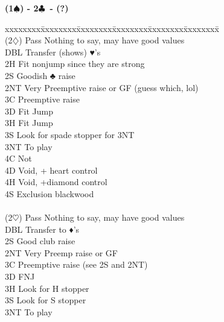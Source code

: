 \documentclass[10pt]{article}
\renewcommand{\c}{$\clubsuit$}
\renewcommand{\d}{$\diamondsuit$}
\newcommand{\h}{$\heartsuit$}
\newcommand{\s}{$\spadesuit$}
\newenvironment{bidtable}[1][]
{\textbf{#1}
  \begin{adjustwidth}{1em}{}
    \addvspace{2pt}
    \begin{tabbing}
      xxxxxxxx\=xxxxxxxx\=xxxxxxxx\=xxxxxxxx\=xxxxxxxx\=xxxxxxxx\=\kill}
{\end{tabbing}\end{adjustwidth}\bigskip}%
\begin{document}
\begin{multicols*}{2}
\begin{bidtable}[(1\s) - 2\c\ - (?)]
                                                                 \\
(2\d)  \> Pass \> Nothing to say, may have good values           \\
       \> DBL  \> Transfer (shows)  ♥’s                          \\
       \> 2H   \> Fit nonjump since they are strong              \\
       \> 2S   \> Goodish ♣ raise                                \\
       \> 2NT  \> Very Preemptive raise or GF (guess which, lol) \\
       \> 3C   \> Preemptive raise                               \\
       \> 3D   \> Fit Jump                                       \\
       \> 3H   \> Fit Jump                                       \\
       \> 3S   \> Look for spade stopper for 3NT                 \\
       \> 3NT  \> To play                                        \\
       \> 4C   \> Not                                            \\
       \> 4D   \> Void,  + heart control                         \\
       \> 4H   \> Void, +diamond control                         \\
       \> 4S   \> Exclusion blackwood                            \\
                                                                 \\
(2\h)  \> Pass \> Nothing to say, may have good values           \\
       \> DBL  \> Transfer to ♦’s                                \\
       \> 2S   \> Good club raise                                \\
       \> 2NT  \> Very Preemp raise or GF                        \\
       \> 3C   \> Preemptive raise (see 2S and 2NT)              \\
       \> 3D   \> FNJ                                            \\
       \> 3H   \> Look for H stopper                             \\
       \> 3S   \> Look for S stopper                             \\
       \> 3NT  \> To play                                        \\

\end{bidtable}
\end{multicols*}
\end{document}
